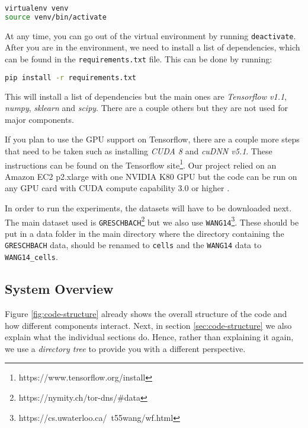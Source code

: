 \begin{lstlisting}[language=Bash]
virtualenv venv
source venv/bin/activate
\end{lstlisting}

At any time, you can go out of the virtual environment by running \texttt{deactivate}.
After you are in the environment, we need to install a list of dependencies, which can be found in the \texttt{requirements.txt} file.
This can be done by running:
\begin{lstlisting}[language=Bash]
pip install -r requirements.txt
\end{lstlisting}

This will install a list of dependencies but the main ones are \textit{Tensorflow v1.1}, \textit{numpy}, \textit{sklearn} and \textit{scipy}.
There are a couple others but they are not used for major components.

If you plan to use the GPU support on Tensorflow, there are a couple more steps that need to be taken such as installing \textit{CUDA 8} and \textit{cuDNN v5.1}.
These instructions can be found on the Tensorflow site\footnote{https://www.tensorflow.org/install}.
Our project relied on an Amazon EC2 p2.xlarge with one NVIDIA K80 GPU but the code can be run on any GPU card with CUDA compute capability 3.0 or higher \cite{tensorflow}.

\newpage

In order to run the experiments, the datasets will have to be downloaded next.
The main dataset used is \texttt{GRESCHBACH}\footnote{https://nymity.ch/tor-dns/\#data} but we also use \texttt{WANG14}\footnote{https://cs.uwaterloo.ca/~t55wang/wf.html}.
These should be put in a data folder in the main directory where the directory containing the \texttt{GRESCHBACH} data, should be renamed to \texttt{cells} and the \texttt{WANG14} data to \texttt{WANG14\_cells}.

\subsection{System Overview}

Figure \ref{fig:code-structure} already shows the overall structure of the code and how different components interact.
Next, in section \ref{sec:code-structure} we also explain what the individual sections do.
Hence, rather than explaining it again, we use a \textit{directory tree} to provide you with a different perspective.

